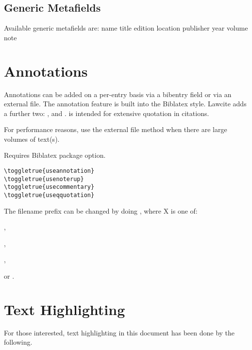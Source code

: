 \subsection{Generic Metafields}
\p Available generic metafields are:
{ name } 
{ title } 
{ edition } 
{ location } 
{ publisher } 
{ year } 
{ volume } 
{ note } 

\section{Annotations}
\p Annotations can be added on a per-entry basis via a bibentry field or via an external file. The annotation feature is built into the Biblatex style. Lawcite adds a further two: , and .  is intended for extensive quotation in citations.

\p For performance reasons, use the external file method when there are large volumes of text(s).

\p Requires  Biblatex package option.
\toggletrue{useannotation}
\toggletrue{usenoterup}
\toggletrue{usecommentary}
\toggletrue{useqquotation}
\begin{verbatim}
\toggletrue{useannotation}
\toggletrue{usenoterup}
\toggletrue{usecommentary}
\toggletrue{useqquotation}
\end{verbatim}

\begin{myquotation}
	
\noindent
{}

\noindent{}
\end{myquotation}

\p The filename prefix can be changed by doing \braces{\ldots}, where X is one of:

\begin{myquotation}
\noindent{},\par
\noindent {}, \par 
\noindent {}, \par
\noindent or . 
\end{myquotation}


\togglefalse{useannotation}
\togglefalse{usenoterup}
\togglefalse{usecommentary}

\section{Text Highlighting}
\p For those interested, text highlighting in this document has been done by the following.

